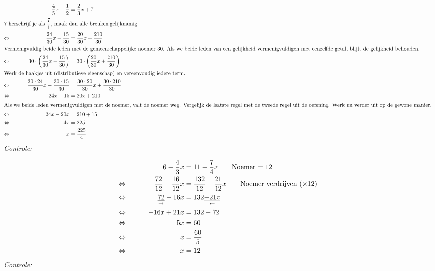 \documentclass[12pt]{article}
\begin{document}
\begin{voorbeeld}
\begin{alignat*}{2}
     && \dfrac{4}{5}x-\dfrac{1}{2}&=\dfrac{2}{3}x+7\\
\intertext{7 herschrijf je als $\dfrac{7}{1}$, maak dan alle breuken gelijknamig}
\Leftrightarrow\mkern40mu && \dfrac{24}{30}x-\dfrac{15}{30}&=\dfrac{20}{30}x+\dfrac{210}{30}\\
\intertext{Vermenigvuldig beide leden met de gemeenschappelijke noemer 30.
	Als we beide leden van een gelijkheid vermenigvuldigen met eenzelfde getal, blijft de gelijkheid behouden.}
\Leftrightarrow\mkern40mu && 30\cdot\left(\dfrac{24}{30}x-\dfrac{15}{30}\right)&=30\cdot\left(\dfrac{20}{30}x+\dfrac{210}{30}\right)\\
\intertext{Werk de haakjes uit (distributieve eigenschap) en vereenvoudig iedere term.}
\Leftrightarrow\mkern40mu && \dfrac{30\cdot24}{30}x-\dfrac{30\cdot15}{30}&=\dfrac{30\cdot20}{30}x+\dfrac{30\cdot210}{30}\\
\Leftrightarrow\mkern40mu && 24x-15 &= 20x+210 \\
\intertext{Als we beide leden vermenigvuldigen met de noemer, valt de noemer weg.
	Vergelijk de laatste regel met de tweede regel uit de oefening.
	Werk nu verder uit op de gewone manier.}
\Leftrightarrow\mkern40mu && 24x-20x &= 210+15 \\
\Leftrightarrow\mkern40mu && 4x &= 225 \\
\Leftrightarrow\mkern40mu && x &= \dfrac{225}{4}
\end{alignat*}
{\em Controle: }\\
\end{voorbeeld}

\begin{voorbeeld}
\begin{alignat*}{2}
     && 6-\dfrac{4}{3}x &= 11-\dfrac{7}{4}x \qquad\text{Noemer $= 12$}\\
\Leftrightarrow\mkern40mu && \dfrac{72}{12}-\dfrac{16}{12}x &= \dfrac{132}{12}-\dfrac{21}{12}x \qquad\text{Noemer verdrijven ($\times 12$)}\\
\Leftrightarrow\mkern40mu && \underset{\rightarrow}{\underline{72}}-16x&=132\underset{\leftarrow}{\underline{-21x}}\\
\Leftrightarrow\mkern40mu && - 16x + 21x	&= 132 - 72\\
\Leftrightarrow\mkern40mu && 5x	&= 60\\
\Leftrightarrow\mkern40mu && x	&= \dfrac{60}{5}\\
\Leftrightarrow\mkern40mu && x	&= 12
\end{alignat*}
{\em Controle: }\\
\end{voorbeeld}
\end{document}
